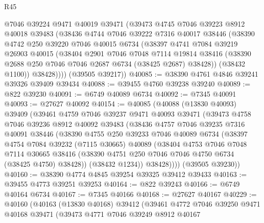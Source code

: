 \begin{lexlean}{R45}
\begin{coremodule}
{        @7046
        @39224
        @9471
        @40019
        @39471
        (@39473
          @4745
          @7046
          @39223
          @8912
          @40018
          @39483
          (@38436
            @4744
            @7046
            @39222
            @7316
            @40017
            @38446
            (@38390
              @4742
              @250
              @39220
              @7046
              @40015
              @6734
              (@38397
                @4741
                @7084
                @39219
                @26903
                @40015
                (@38404
                  @2901
                  @7046
                  @7048
                  @7114
                  @19814
                  @38416
                  (@38390 @2688 @250 @7046 @7046 @2687 @6734 (@38425 @2687) @38428))
                (@38432 @1100))
              @38428))))
      (@39505 @39217))
@40085 := @38390 @4761 @4846 @39241 @39326 @39409 @39434
@40088 := @39455 @4760 @39238 @39240
@40089 := @822 @39230
@40091 := @6749 @40089 @6734
@40092 := @7345 @40091
@40093 := @27627 @40092
@40154 := @40085
    (@40088
      (@13830 @40093)
      @39409
      (@39461
        @4759
        @7046
        @39237
        @9471
        @40093
        @39471
        (@39473
          @4758
          @7046
          @39236
          @8912
          @40092
          @39483
          (@38436
            @4757
            @7046
            @39235
            @7316
            @40091
            @38446
            (@38390
              @4755
              @250
              @39233
              @7046
              @40089
              @6734
              (@38397
                @4754
                @7084
                @39232
                (@7115 @30665)
                @40089
                (@38404
                  @4753
                  @7046
                  @7048
                  @7114
                  @30665
                  @38416
                  (@38390 @4751 @250 @7046 @7046 @4750 @6734 (@38425 @4750) @38428))
                (@38432 @1234))
              @38428))))
      (@39505 @39230))
@40160 := @38390 @4774 @4845 @39254 @39325 @39412 @39433
@40163 := @39455 @4773 @39251 @39253
@40164 := @822 @39243
@40166 := @6749 @40164 @6734
@40167 := @7345 @40166
@40168 := @27627 @40167
@40229 := @40160
    (@40163
      (@13830 @40168)
      @39412
      (@39461
        @4772
        @7046
        @39250
        @9471
        @40168
        @39471
        (@39473
          @4771
          @7046
          @39249
          @8912
          @40167
}
\end{coremodule}
\end{lexlean}
